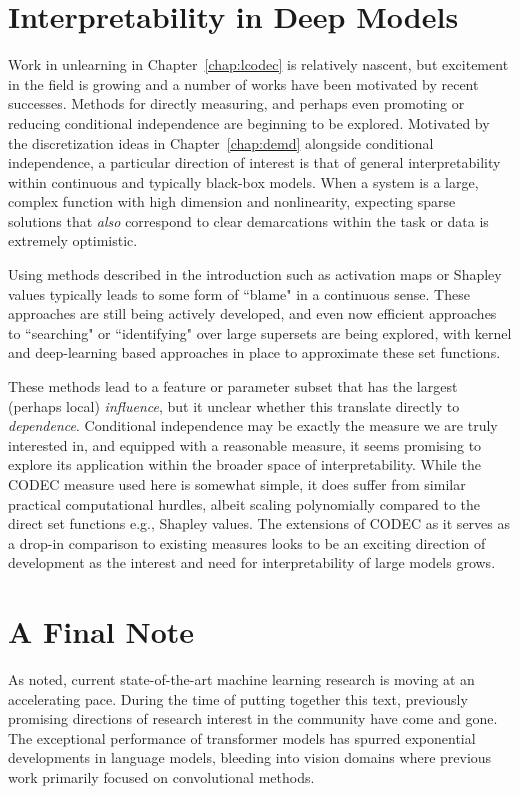 \section{Interpretability in Deep Models}\label{sec:latents}
Work in unlearning in Chapter~\ref{chap:lcodec} is relatively nascent,
but excitement in the field is growing
and a number of works have been motivated
by recent successes.
Methods for directly measuring, and perhaps
even promoting or reducing conditional
independence are beginning to be explored.
Motivated by the discretization ideas
in Chapter~\ref{chap:demd} alongside
conditional independence,
a particular direction of interest
is that of general interpretability 
within continuous and typically
black-box models.
When a system is a large,
complex function with high dimension
and nonlinearity,
expecting sparse solutions
that \textit{also} correspond
to clear demarcations within the task or 
data is extremely optimistic.

Using methods described in the introduction
such as activation maps
or Shapley values typically 
leads to some form of ``blame"
in a continuous sense.
These approaches are still being actively
developed,
and even now efficient approaches
to ``searching" or ``identifying"
over large supersets are being
explored, with kernel
and deep-learning based approaches
in place to approximate these set functions.

These methods lead to a feature or parameter
subset that
has the largest (perhaps local) \textit{influence},
but it unclear whether
this translate directly to \textit{dependence}.
Conditional independence may be exactly
the measure we are truly interested in,
and equipped with a reasonable measure,
it seems promising to explore its
application within the broader space of
interpretability.
While the CODEC measure used
here is somewhat simple,
it does suffer from
similar practical computational hurdles,
albeit scaling polynomially
compared to the direct set functions
e.g., Shapley values.
The extensions of CODEC
as it serves as a drop-in
comparison to existing measures
looks to be an exciting direction of development
as the interest and need for interpretability
of large models grows.

\section*{A Final Note}
As noted, current state-of-the-art
machine learning research
is moving at an accelerating pace.
During the time of putting
together this text,
previously promising directions
of research interest in the community
have come and gone.
The exceptional performance
of transformer models
has spurred exponential developments
in language models,
bleeding into vision domains
where previous work primarily
focused on convolutional methods.

